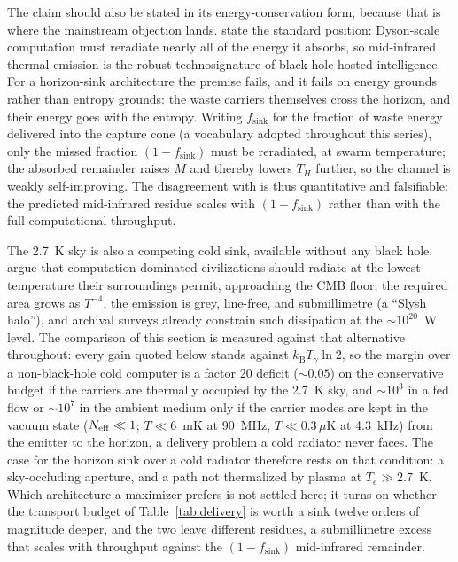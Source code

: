 \documentclass[11pt]{article}
\newcommand{\kb}{\ensuremath{k_{\mathrm{B}}}}
\begin{document}
The claim should also be stated in its energy-conservation form, because that is where the mainstream objection lands. \citet{Curtis2026DysonMinds} state the standard position: Dyson-scale computation must reradiate nearly all of the energy it absorbs, so mid-infrared thermal emission is the robust technosignature of black-hole-hosted intelligence. For a horizon-sink architecture the premise fails, and it fails on energy grounds rather than entropy grounds: the waste carriers themselves cross the horizon, and their energy goes with the entropy. Writing $f_{\mathrm{sink}}$ for the fraction of waste energy delivered into the capture cone (a vocabulary adopted throughout this series), only the missed fraction $(1-f_{\mathrm{sink}})$ must be reradiated, at swarm temperature; the absorbed remainder raises $M$ and thereby lowers $T_H$ further, so the channel is weakly self-improving. The disagreement with \citet{Curtis2026DysonMinds} is thus quantitative and falsifiable: the predicted mid-infrared residue scales with $(1-f_{\mathrm{sink}})$ rather than with the full computational throughput.

The 2.7~K sky is also a competing cold sink, available without any black hole. \citet{Garrett2026Slysh} argue that computation-dominated civilizations should radiate at the lowest temperature their surroundings permit, approaching the CMB floor; the required area grows as $T^{-4}$, the emission is grey, line-free, and submillimetre (a ``Slysh halo''), and archival surveys already constrain such dissipation at the $\sim$$10^{20}$~W level. The comparison of this section is measured against that alternative throughout: every gain quoted below stands against $\kb T_{\gamma}\ln 2$, so the margin over a non-black-hole cold computer is a factor 20 deficit ($\sim 0.05$) on the conservative budget if the carriers are thermally occupied by the 2.7~K sky, and $\sim 10^{3}$ in a fed flow or $\sim 10^{7}$ in the ambient medium only if the carrier modes are kept in the vacuum state ($N_{\rm eff}\ll1$; $T\ll6$~mK at 90~MHz, $T\ll0.3\,\mu$K at 4.3~kHz) from the emitter to the horizon, a delivery problem a cold radiator never faces. The case for the horizon sink over a cold radiator therefore rests on that condition: a sky-occluding aperture, and a path not thermalized by plasma at $T_e \gg 2.7$~K. Which architecture a maximizer prefers is not settled here; it turns on whether the transport budget of Table~\ref{tab:delivery} is worth a sink twelve orders of magnitude deeper, and the two leave different residues, a submillimetre excess that scales with throughput against the $(1-f_{\mathrm{sink}})$ mid-infrared remainder.
\end{document}
